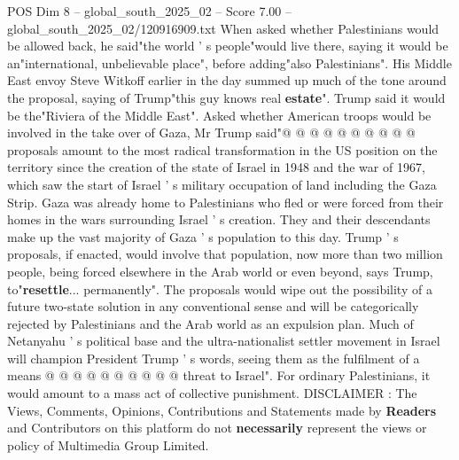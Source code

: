 \begin{textsample}{POS Dim 8 – global\_south\_2025\_02 – Score 7.00 – global\_south\_2025\_02/120916909.txt}
When asked whether Palestinians would be allowed back, he said"the world ' s people"would live there, saying it would be an"international, unbelievable place", before adding"also Palestinians".
His Middle East envoy Steve Witkoff earlier in the day summed up much of the tone around the proposal, saying of Trump"this guy knows real \textbf{estate}".
Trump said it would be the"Riviera of the Middle East".
Asked whether American troops would be involved in the take over of Gaza, Mr Trump said"@ @ @ @ @ @ @ @ @ @ proposals amount to the most radical transformation in the US position on the territory since the creation of the state of Israel in 1948 and the war of 1967, which saw the start of Israel ' s military occupation of land including the Gaza Strip.
Gaza was already home to Palestinians who fled or were forced from their homes in the wars surrounding Israel ' s creation.
They and their descendants make up the vast majority of Gaza ' s population to this day.
Trump ' s proposals, if enacted, would involve that population, now more than two million people, being forced elsewhere in the Arab world or even beyond, says Trump, to"\textbf{resettle}... permanently".
The proposals would wipe out the possibility of a future two-state solution in any conventional sense and will be categorically rejected by Palestinians and the Arab world as an expulsion plan.
Much of Netanyahu ' s political base and the ultra-nationalist settler movement in Israel will champion President Trump ' s words, seeing them as the fulfilment of a means @ @ @ @ @ @ @ @ @ @ threat to Israel".
For ordinary Palestinians, it would amount to a mass act of collective punishment.
DISCLAIMER : The Views, Comments, Opinions, Contributions and Statements made by \textbf{Readers} and Contributors on this platform do not \textbf{necessarily} represent the views or policy of Multimedia Group Limited.

\end{textsample}
